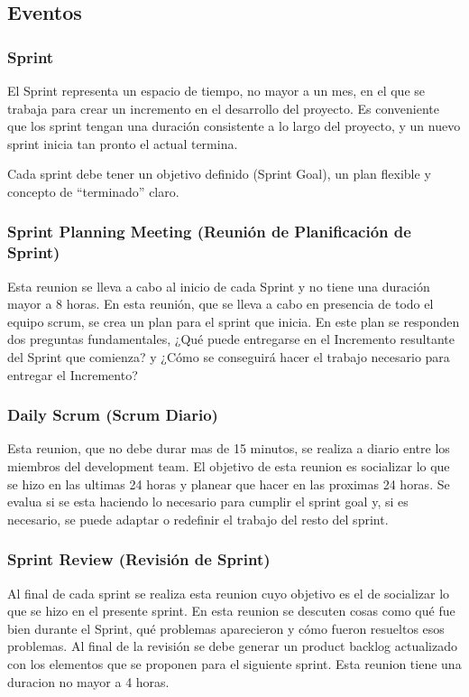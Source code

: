 \subsection{Eventos}

\subsubsection{Sprint}

El Sprint representa un espacio de tiempo, no mayor a un mes, en el que se trabaja para crear un incremento en el desarrollo del proyecto. Es conveniente que los sprint tengan una duración consistente a lo largo del proyecto, y un nuevo sprint inicia tan pronto el actual termina.

Cada sprint debe tener un objetivo definido (Sprint Goal), un plan flexible y concepto de ``terminado'' claro. 

\subsubsection{Sprint Planning Meeting (Reunión de Planificación de Sprint)}

Esta reunion se lleva a cabo al inicio de cada Sprint y no tiene una duración mayor a 8 horas. En esta reunión, que se lleva a cabo en presencia de todo el equipo scrum, se crea un plan para el sprint que inicia. En este plan se responden dos preguntas fundamentales, ¿Qué puede entregarse en el Incremento resultante del Sprint que comienza? y ¿Cómo se conseguirá hacer el trabajo necesario para entregar el Incremento?

\subsubsection{Daily Scrum (Scrum Diario)}

Esta reunion, que no debe durar mas de 15 minutos, se realiza a diario entre los miembros del development team. El objetivo de esta reunion es socializar lo que se hizo en las ultimas 24 horas y planear que hacer en las proximas 24 horas. Se evalua si se esta haciendo lo necesario para cumplir el sprint goal y, si es necesario, se puede adaptar o redefinir el trabajo del resto del sprint.

\subsubsection{Sprint Review (Revisión de Sprint)}

Al final de cada sprint se realiza esta reunion cuyo objetivo es el de socializar lo que se hizo en el presente sprint. En esta reunion se descuten cosas como qué fue bien durante el Sprint, qué problemas aparecieron y cómo fueron resueltos esos problemas. Al final de la revisión se debe generar un product backlog actualizado con los elementos que se proponen para el siguiente sprint. Esta reunion tiene una duracion no mayor a 4 horas.

